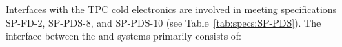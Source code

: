 

Interfaces with the TPC cold electronics are involved in meeting specifications SP-FD-2, SP-PDS-8, and SP-PDS-10 (see Table~\ref{tab:specs:SP-PDS}).  The interface between the  and  systems primarily consists of:

